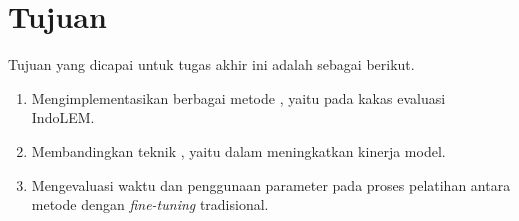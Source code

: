 \section{Tujuan}
\label{sec:tujuan}

Tujuan yang  dicapai untuk tugas akhir ini adalah sebagai berikut.

\begin{enumerate}
    \item Mengimplementasikan berbagai metode \PEFT, yaitu \methodPEFT pada kakas evaluasi IndoLEM.
    \item Membandingkan teknik \PEFT, yaitu \methodPEFT dalam meningkatkan kinerja model.
    \item Mengevaluasi waktu dan penggunaan parameter pada proses pelatihan antara metode \PEFT dengan \textit{fine-tuning} tradisional.
\end{enumerate}
